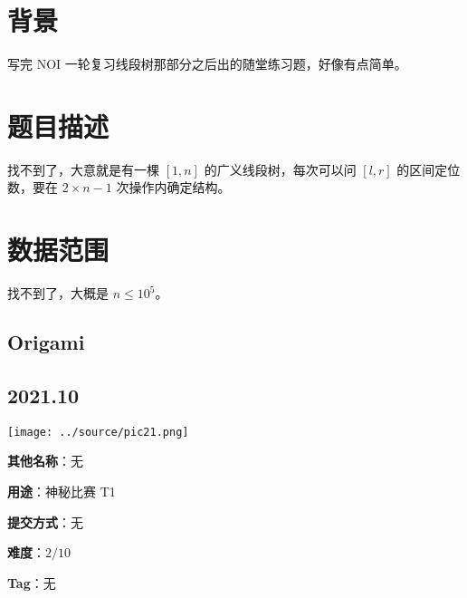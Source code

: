\documentclass[a4paper,10pt]{article}
\begin{document}
\newpage

\section*{背景}

写完 NOI 一轮复习线段树那部分之后出的随堂练习题，好像有点简单。

\section*{题目描述}

找不到了，大意就是有一棵 $[1,n]$ 的广义线段树，每次可以问 $[l,r]$ 的区间定位数，要在 $2\times n-1$ 次操作内确定结构。

\section*{数据范围}

找不到了，大概是 $n\leq 10^5$。

\newpage

\vspace*{\fill}
\begin{center}

\section{Origami}

\subsection*{2021.10}

\vspace{10pt}

\texttt{[image: ../source/pic21.png]}

\vspace{10pt}

\textbf{其他名称}：无

\vspace{10pt}

\textbf{用途}：神秘比赛 T1

\vspace{10pt}

\textbf{提交方式}：无

\vspace{10pt}

\textbf{难度}：$2/10$

\vspace{10pt}

\textbf{Tag}：无

\end{center}
\vspace*{\fill}
\end{document}

